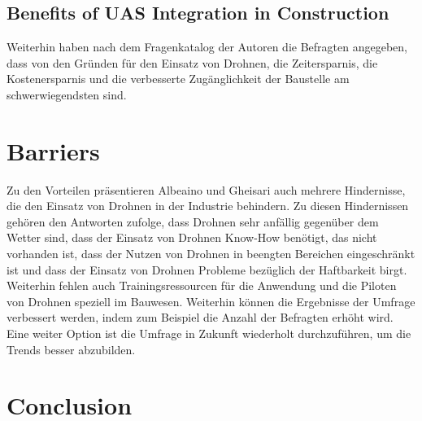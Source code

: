 \subsection{Benefits of UAS Integration in Construction}

Weiterhin haben nach dem Fragenkatalog der Autoren die Befragten angegeben, dass von den Gründen für den Einsatz von Drohnen, die Zeitersparnis, die Kostenersparnis und die verbesserte Zugänglichkeit der Baustelle am schwerwiegendsten sind. \cite[S. 98--99]{abaeano2021trends}

\section{Barriers}


Zu den Vorteilen präsentieren Albeaino und Gheisari auch mehrere Hindernisse, die den Einsatz von Drohnen in der Industrie behindern.
Zu diesen Hindernissen gehören den Antworten zufolge, dass Drohnen sehr anfällig gegenüber dem Wetter sind, dass der Einsatz von Drohnen Know-How benötigt, das nicht vorhanden ist, dass der Nutzen von Drohnen in beengten Bereichen eingeschränkt ist und dass der Einsatz von Drohnen Probleme bezüglich der Haftbarkeit birgt.
Weiterhin fehlen auch Trainingsressourcen für die Anwendung und die Piloten von Drohnen speziell im Bauwesen.
Weiterhin können die Ergebnisse der Umfrage verbessert werden, indem zum Beispiel die Anzahl der Befragten erhöht wird.
Eine weiter Option ist die Umfrage in Zukunft wiederholt durchzuführen, um die Trends besser abzubilden. \cite[S. 99--104]{abaeano2021trends}

\section{Conclusion}


